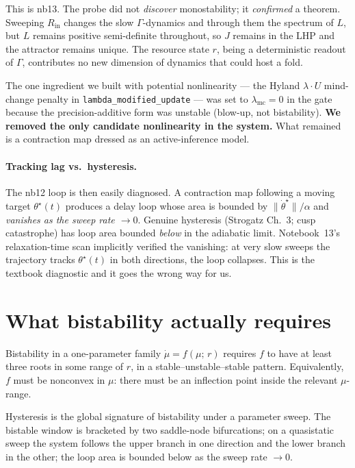\documentclass[11pt,a4paper]{article}
\theoremstyle{plain}
\begin{document}
This is nb13. The probe did not \emph{discover} monostability; it
\emph{confirmed} a theorem. Sweeping $R_{\text{in}}$ changes the slow
$\Gamma$-dynamics and through them the spectrum of $L$, but $L$ remains
positive semi-definite throughout, so $J$ remains in the LHP and the
attractor remains unique. The resource state $r$, being a deterministic
readout of $\Gamma$, contributes no new dimension of dynamics that could
host a fold.

The one ingredient we built with potential nonlinearity --- the Hyland
$\lambda \cdot U$ mind-change penalty in
\texttt{lambda\_modified\_update} --- was set to $\lambda_{\text{mc}}=0$
in the gate because the precision-additive form was unstable (blow-up,
not bistability). \textbf{We removed the only candidate nonlinearity in
the system.} What remained is a contraction map dressed as an
active-inference model.

\paragraph{Tracking lag vs.\ hysteresis.} The nb12 loop is then easily
diagnosed. A contraction map following a moving target $\theta^\star(t)$
produces a delay loop whose area is bounded by
$\|\dot{\theta}^\star\|/\alpha$ and \emph{vanishes as the sweep rate
$\to 0$}. Genuine hysteresis (Strogatz Ch.~3; cusp catastrophe) has loop
area bounded \emph{below} in the adiabatic limit. Notebook~13's
relaxation-time scan implicitly verified the vanishing: at very slow
sweeps the trajectory tracks $\theta^\star(t)$ in both directions, the
loop collapses. This is the textbook diagnostic and it goes the wrong
way for us.

\section{What bistability actually requires}
\label{sec:bistability}

Bistability in a one-parameter family $\dot{\mu} = f(\mu;\,r)$ requires
$f$ to have at least three roots in some range of $r$, in a
stable--unstable--stable pattern. Equivalently, $f$ must be nonconvex
in $\mu$: there must be an inflection point inside the relevant
$\mu$-range.

Hysteresis is the global signature of bistability under a parameter
sweep. The bistable window is bracketed by two saddle-node
bifurcations; on a quasistatic sweep the system follows the upper
branch in one direction and the lower branch in the other; the
loop area is bounded below as the sweep rate $\to 0$.
\end{document}
